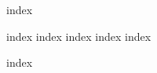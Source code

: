 \documentclass[
    a5paper, %
    openright, %
    twoside, %
    english, %
    brazil, %
    chapter=TITLE,
    section=TITLE,
]{abntex2}
\begin{document}
\sffamily

\pretextual

{index}

\textual

{index}
{index}
{index}
{index}
{index}

\printbibliography

{index}
\end{document}
